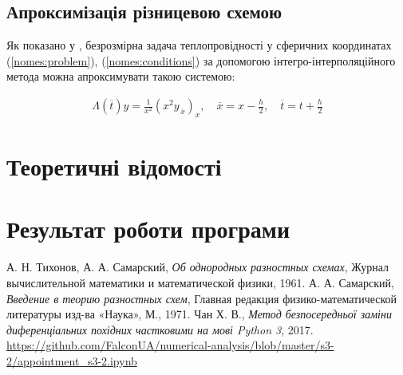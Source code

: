 \subsection{Апроксимізація різницевою схемою}

Як показано у \cite[с. 185-208]{Samarskii71}, безрозмірна задача теплопровідності у сферичних координатах (\ref{nomes:problem}), (\ref{nomes:conditions}) за допомогою інтегро-інтерполяційного метода можна апроксимувати такою системою:

\begin{equation}
\begin{multlined} \label{nomes:approx}
\Lambda(\overline{t}) y = \frac{1}{x^2}\left(x^2 y_{\,\overline{x}}\right)_x, \quad \overline{x} = x - \frac{h}{2}, \quad \overline{t} = t + \frac{h}{2}
\end{multlined}
\end{equation}



\section{Теоретичні відомості}





\section{Результат роботи програми}


\begin{thebibliography}{9}

  А. Н. Тихонов, А. А. Самарский,
  \emph{Об однородных разностных схемах},
  Журнал вычислительной математики и математической физики, 1961.
  А. А. Самарский,
  \emph{Введение в теорию разностных схем},
  Главная редакция физико-математической литературы изд-ва «Наука», 
  М., 1971. 
  Чан Х. В., \emph{Метод безпосередньої заміни диференціальних похідних частковими на мові Python 3}, 2017. 
  \url{https://github.com/FalconUA/numerical-analysis/blob/master/s3-2/appointment_s3-2.ipynb}

\end{thebibliography}
